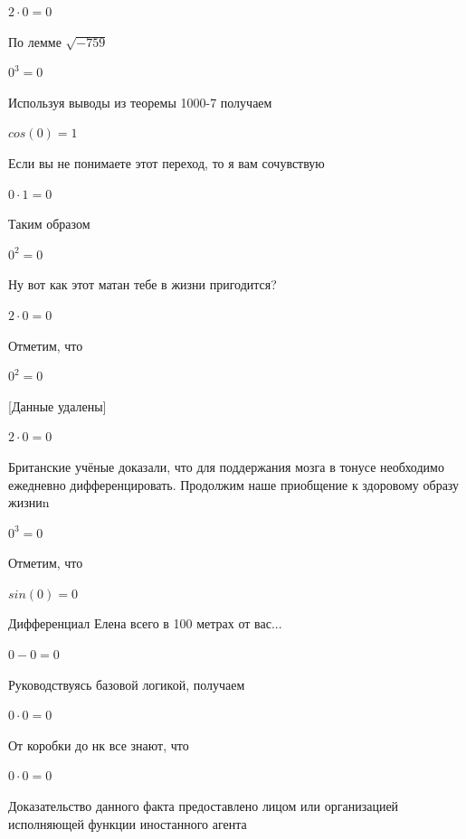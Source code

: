 \documentclass[12pt,a4paper,fleqn]{article}
\begin{document}
\begin{center}$2 \cdot 0 = 0$\end{center}
По лемме $\sqrt{-759}$
\begin{center}$0^{3} = 0$\end{center}
Используя выводы из теоремы 1000-7 получаем

\begin{center}$cos(0) = 1$\end{center}
Если вы не понимаете этот переход, то я вам сочувствую

\begin{center}$0 \cdot 1 = 0$\end{center}
Таким образом

\begin{center}$0^{2} = 0$\end{center}
Ну вот как этот матан тебе в жизни пригодится?

\begin{center}$2 \cdot 0 = 0$\end{center}
Отметим, что

\begin{center}$0^{2} = 0$\end{center}
[Данные удалены]

\begin{center}$2 \cdot 0 = 0$\end{center}
Британские учёные доказали, что для поддержания мозга в тонусе необходимо ежедневно дифференцировать. Продолжим наше приобщение к здоровому образу жизниn

\begin{center}$0^{3} = 0$\end{center}
Отметим, что

\begin{center}$sin(0) = 0$\end{center}
Дифференциал Елена всего в 100 метрах от вас...

\begin{center}$0-0 = 0$\end{center}
Руководствуясь базовой логикой, получаем

\begin{center}$0 \cdot 0 = 0$\end{center}
От коробки до нк все знают, что

\begin{center}$0 \cdot 0 = 0$\end{center}
Доказательство данного факта предоставлено лицом или организацией исполняющей функции иностанного агента
\end{document}
